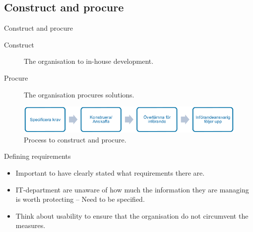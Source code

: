\documentclass{beamer}
\begin{document}
\subsection{Construct and procure}
\begin{frame}{Construct and procure}
  \begin{description}
    \item[Construct] The organisation to in-house development.
    \item[Procure] The organisation procures solutions.
  \end{description}
  \begin{figure}
    \includegraphics[width=\textwidth]{infora.png}
    \caption{Process to construct and procure.}
  \end{figure}
\end{frame}
\begin{frame}{Defining requirements}
  \begin{itemize}
    \item Important to have clearly stated what requirements there are.
    \item IT-department are unaware of how much the information they are
      managing is worth protecting -- Need to be specified.
    \item Think about usability to ensure that the organisation do not
      circumvent the measures.
  \end{itemize}
\end{frame}
\end{document}
